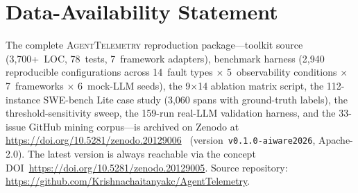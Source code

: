\documentclass[sigconf,screen]{acmart}
\begin{document}
\section*{Data-Availability Statement}

The complete \textsc{AgentTelemetry} reproduction package---toolkit
source (3{,}700+~LOC, 78~tests, 7~framework adapters), benchmark
harness (2{,}940 reproducible configurations across 14~fault
types $\times$ 5~observability conditions $\times$ 7~frameworks
$\times$ 6~mock-LLM seeds), the 9$\times$14 ablation matrix script,
the 112-instance SWE-bench Lite case study (3{,}060 spans with
ground-truth labels), the threshold-sensitivity sweep, the 159-run
real-LLM validation harness, and the 33-issue GitHub mining
corpus---is archived on Zenodo at
\url{https://doi.org/10.5281/zenodo.20129006}~\cite{agenttelemetry_artifact}
(version~\texttt{v0.1.0-aiware2026}, Apache-2.0).
The latest version is always reachable via the concept
DOI~\url{https://doi.org/10.5281/zenodo.20129005}.
Source repository: \url{https://github.com/Krishnachaitanyakc/AgentTelemetry}.


\balance


\end{document}
